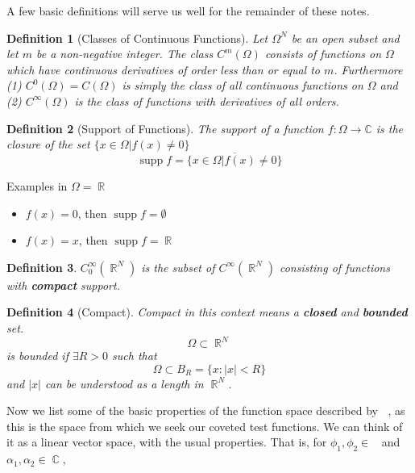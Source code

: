 \documentclass[12pt, a4]{article}
\newtheorem{definition}{Definition}[section]
\DeclareMathOperator\supp{supp}
\DeclareMathOperator\reals{\mathbb{R}}
\DeclareMathOperator\complexes{\mathbb{C}}
\DeclareMathOperator\tfspace{C_0^\infty}
\begin{document}
A few basic definitions will serve us well for the remainder of these notes.

\begin{definition}[Classes of Continuous Functions]
Let $\Omega^N$ be an open subset and let $m$ be a non-negative integer. The class $C^m(\Omega)$ consists of functions on $\Omega$ which have continuous derivatives of order less than or equal to $m$. Furthermore (1) $C^0(\Omega) = C(\Omega)$  is simply the class of all continuous functions on $\Omega$ and (2) $C^\infty (\Omega)$ is the class of functions with derivatives of all orders.
\label{def:c_m_functions}
\end{definition}

\begin{definition}[Support of Functions]
The support of a function $f : \Omega \rightarrow \mathbb{C}$ is the closure of the set $\{x \in \Omega | f(x) \neq 0\}$
\[ \supp f = \overline{\{x \in \Omega | f(x) \neq 0\}}\]
\label{def:support_of_functions}
\end{definition}

Examples in $\Omega = \reals$

\begin{itemize}
    \item $f(x) = 0$, then  $\supp f = \emptyset$
    \item $f(x) = x$, then $\supp f = \reals$
\end{itemize}

\begin{definition}
    $C_0^\infty(\reals^N)$ is the subset of $C^\infty(\reals^N)$ consisting of functions with \textbf{compact} support.
\end{definition}

\begin{definition}[Compact]
    Compact in this context means a \textbf{closed} and \textbf{bounded} set.
    \[ \Omega \subset \reals^N\]
    is bounded if $\exists R > 0$ such that
    \[\Omega \subset B_R = \{ x : |x| < R\}\]
    and $|x|$ can be understood as a length in $\reals^N$.
    \label{def:compact_function}
\end{definition}

Now we list some of the basic properties of the function space described by $\tfspace$, as this is the space from which we seek our coveted test functions. We can think of it as a linear vector space, with the usual properties. That is, for $\phi_1, \phi_2 \in \tfspace$ and $\alpha_1, \alpha_2 \in \complexes$,
\end{document}
